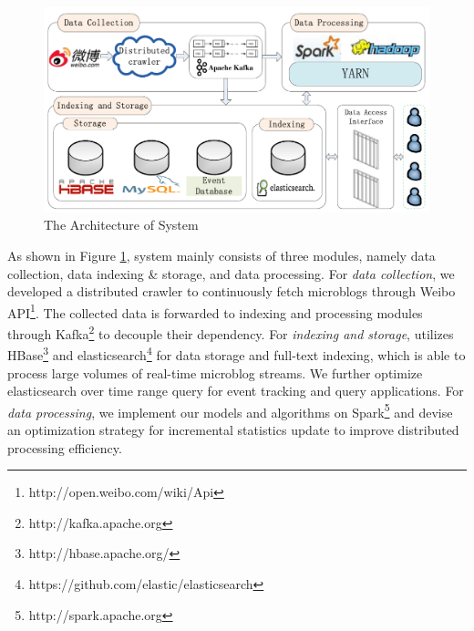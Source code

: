 

\begin{figure}[!t]
\centering
\includegraphics[scale=0.47]{system_architecture.pdf}
\centering
\caption{The Architecture of \ring System}
\label{fig:system_architecture}
\end{figure}

As shown in Figure \ref{fig:system_architecture},
\ring system mainly consists of three modules, namely data collection, data indexing \& storage, and data processing.
For \emph{data collection}, we developed a distributed crawler to continuously fetch microblogs through Weibo API\footnote{http://open.weibo.com/wiki/Api}.
The collected data is forwarded to indexing and processing modules through Kafka\footnote{http://kafka.apache.org} to decouple their dependency.
For \emph{indexing and storage}, \ring utilizes HBase\footnote{http://hbase.apache.org/} and elasticsearch\footnote{https://github.com/elastic/elasticsearch} for data storage and full-text indexing, which is able to process large volumes of real-time microblog streams.
We further optimize elasticsearch over time range query for event tracking and query applications.
For \emph{data processing}, we implement our models and algorithms on Spark\footnote{http://spark.apache.org} and
 devise an optimization strategy for incremental statistics update to improve distributed processing efficiency.
